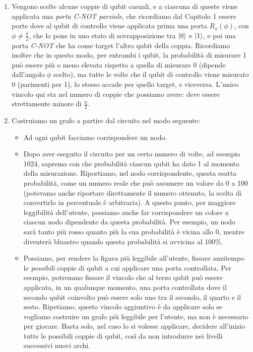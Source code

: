 \documentclass{book}
\theoremstyle{definition}
\theoremstyle{definition}
\theoremstyle{definition}
\theoremstyle{plain}
\theoremstyle{plain}
\theoremstyle{plain}
\theoremstyle{plain}
\begin{document}
\begin{enumerate}
    \item Vengono scelte alcune coppie di qubit casuali, e a ciascuna di queste viene applicata una \emph{porta C-NOT parziale}, che ricordiamo dal Capitolo 1 essere porte dove al qubit di controllo viene applicata prima una porta $R_x(\phi)$, con $\phi \neq \frac{\pi}{2}$, che lo pone in uno stato di sovrapposizione tra $\ket{0}$ e $\ket{1}$, e poi una porta \emph{C-NOT} che ha come target l'altro qubit della coppia. Ricordiamo inoltre che in questo modo, per entrambi i qubit, la probabilità di misurare 1 può essere più o meno elevata rispetto a quella di misurare 0 (dipende dall'angolo $\phi$ scelto), ma tutte le volte che il qubit di controllo viene misurato 0 (parimenti per 1), lo stesso accade per quello target, e viceversa. L'unico vincolo qui sta nel numero di coppie che possiamo avere: deve essere strettamente minore di $\frac{n}{2}$.
    \item Costruiamo un grafo a partire dal circuito nel modo seguente:
    \begin{itemize}
        \item Ad ogni qubit facciamo corrispondere un nodo.
        \item Dopo aver eseguito il circuito per un certo numero di volte, ad esempio 1024, sapremo con che probabilità ciascun qubit ha dato 1 al momento della misurazione. Riportiamo, nel nodo corrispondente, questa esatta probabilità, come un numero reale che può assumere un valore da 0 a 100 (potevamo anche riportare direttamente il numero ottenuto, la scelta di convertirlo in percentuale è arbitraria). A questo punto, per maggiore leggibilità dell'utente, possiamo anche far corrispondere un colore a ciascun nodo dipendente da questa probabilità. Per esempio, un nodo sarà tanto più rosso quanto più la sua probabilità è vicina allo 0, mentre diventerà bluastro quando questa probabilità si avvicina al 100\%.
        \item Possiamo, per rendere la figura più leggibile all'utente, fissare anzitempo le \emph{possibili} coppie di qubit a cui applicare una porta controllata. Per esempio, potremmo fissare il vincolo che al terzo qubit può essere applicata, in un qualunque momento, una porta controllata dove il secondo qubit coinvolto può essere solo uno tra il secondo, il quarto e il sesto. Ripetiamo, questo vincolo aggiuntivo è da applicare solo se vogliamo costruire un grafo più leggibile per l'utente, ma non è necessario per giocare. Basta solo, nel caso lo si volesse applicare, decidere all'inizio tutte le possibili coppie di qubit, così da non introdurre nei livelli successivi nuovi archi.

\end{itemize}
\end{enumerate}
\end{document}

